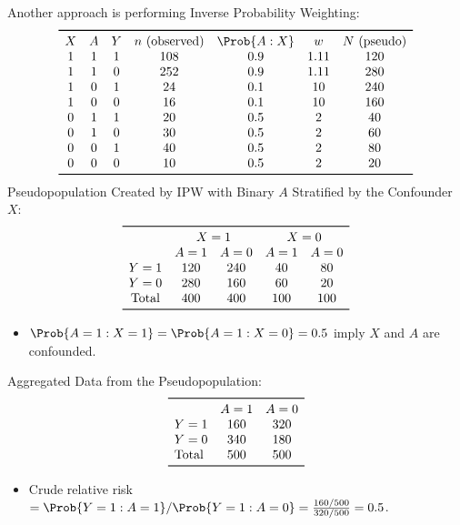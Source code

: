 Another approach is performing Inverse Probability Weighting:
\[ \begin{array}{ccccccc}
            \toprule
            X & A & Y & n~\text{(observed)} & \Prob{A\given X} & w    & N~\text{(pseudo)} \\
            1 & 1 & 1 & 108                 & 0.9              & 1.11 & 120               \\
            1 & 1 & 0 & 252                 & 0.9              & 1.11 & 280               \\
            1 & 0 & 1 & 24                  & 0.1              & 10   & 240               \\
            1 & 0 & 0 & 16                  & 0.1              & 10   & 160               \\
            0 & 1 & 1 & 20                  & 0.5              & 2    & 40                \\
            0 & 1 & 0 & 30                  & 0.5              & 2    & 60                \\
            0 & 0 & 1 & 40                  & 0.5              & 2    & 80                \\
            0 & 0 & 0 & 10                  & 0.5              & 2    & 20                \\
            \bottomrule
      \end{array} \]
Pseudopopulation Created by IPW with Binary $A$ Stratified by the
Confounder $X$:
\[ \begin{array}{ccccc}
            \toprule
                         & \multicolumn{2}{c}{X=1} & \multicolumn{2}{c}{X=0}             \\
                         & A=1                     & A=0                     & A=1 & A=0 \\
            Y=1          & 120                     & 240                     & 40  & 80  \\
            Y=0          & 280                     & 160                     & 60  & 20  \\
            \text{Total} & 400                     & 400                     & 100 & 100 \\
            \bottomrule
      \end{array} \]
\begin{itemize}
      \item $ \Prob{A=1\given X=1}= \Prob{A=1\given X=0}=0.5 $ imply $ X $ and $ A $ are confounded.
\end{itemize}
Aggregated Data from the Pseudopopulation:
\[ \begin{array}{lcc}
            \toprule
                         & A=1 & A=0 \\
            Y=1          & 160 & 320 \\
            Y=0          & 340 & 180 \\
            \text{Total} & 500 & 500 \\
            \bottomrule
      \end{array} \]
\begin{itemize}
      \item Crude relative risk $ =\Prob{Y=1\given A=1}/\Prob{Y=1\given A=0}=\frac{160/500}{320/500}=0.5 $.
\end{itemize}
